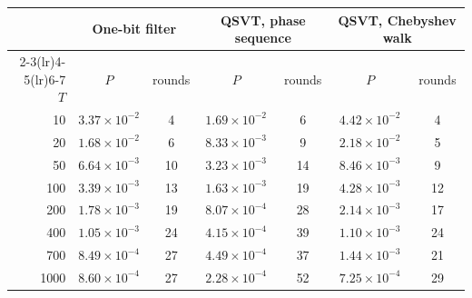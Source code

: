 \begin{tabular}{rcccccc}\toprule
 & \multicolumn{2}{c}{One-bit filter} & \multicolumn{2}{c}{QSVT, phase sequence} & \multicolumn{2}{c}{QSVT, Chebyshev walk}\\
\cmidrule(lr){2-3}\cmidrule(lr){4-5}\cmidrule(lr){6-7}
$T$ & $P$ & rounds & $P$ & rounds & $P$ & rounds\\\midrule
10 & $3.37\times10^{-2}$ & 4 & $1.69\times10^{-2}$ & 6 & $4.42\times10^{-2}$ & 4\\
20 & $1.68\times10^{-2}$ & 6 & $8.33\times10^{-3}$ & 9 & $2.18\times10^{-2}$ & 5\\
50 & $6.64\times10^{-3}$ & 10 & $3.23\times10^{-3}$ & 14 & $8.46\times10^{-3}$ & 9\\
100 & $3.39\times10^{-3}$ & 13 & $1.63\times10^{-3}$ & 19 & $4.28\times10^{-3}$ & 12\\
200 & $1.78\times10^{-3}$ & 19 & $8.07\times10^{-4}$ & 28 & $2.14\times10^{-3}$ & 17\\
400 & $1.05\times10^{-3}$ & 24 & $4.15\times10^{-4}$ & 39 & $1.10\times10^{-3}$ & 24\\
700 & $8.49\times10^{-4}$ & 27 & $4.49\times10^{-4}$ & 37 & $1.44\times10^{-3}$ & 21\\
1000 & $8.60\times10^{-4}$ & 27 & $2.28\times10^{-4}$ & 52 & $7.25\times10^{-4}$ & 29\\
\bottomrule
\end{tabular}
